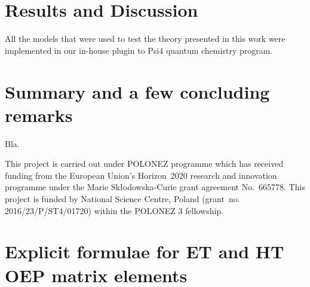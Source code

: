 \section{\label{s:4}Results and Discussion}

All the models that were used to test the theory presented in this work
were implemented in our in\hyp{}house plugin to {\sc Psi4} quantum chemistry program.\cite{Psi4.JCTC.2017}


\section{\label{s:5}Summary and a few concluding remarks}

Bla.

\begin{acknowledgments}
This project is carried out under POLONEZ programme which has received funding from the European Union's
Horizon~2020 research and innovation programme under the Marie Skłodowska-Curie grant agreement 
No.~665778. This project is funded by National Science Centre, Poland 
(grant~no. 2016/23/P/ST4/01720) within the POLONEZ 3 fellowship.
\end{acknowledgments}

\appendix

\section{Explicit formulae for ET and HT OEP matrix elements\label{a:gdf-formulae}}

